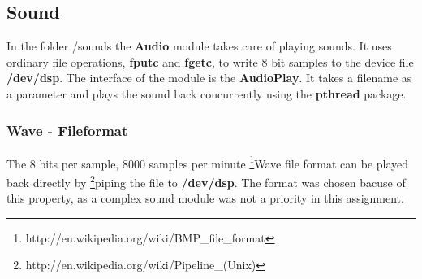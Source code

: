 \subsection{Sound}
In the folder /sounds the {\bf Audio} module takes care of playing sounds. It uses ordinary file
operations, {\bf fputc} and {\bf fgetc}, to write 8 bit samples to the device file {\bf /dev/dsp}. The
interface of the module is the {\bf AudioPlay}. It takes a filename as a parameter and plays the
sound back concurrently using the {\bf pthread} package.

\subsubsection{Wave - Fileformat}
The 8 bits per sample, 8000 samples per
minute \footnote{http://en.wikipedia.org/wiki/BMP\_file\_format}{Wave file format} can be played
back directly by \footnote{http://en.wikipedia.org/wiki/Pipeline\_(Unix)}{piping} the file to {\bf
  /dev/dsp}. The format was chosen bacuse of this property, as a complex sound module was not a priority
in this assignment.
